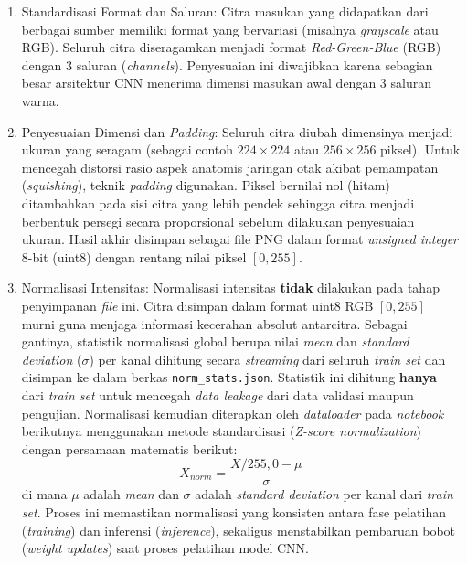 \begin{enumerate}
	\item Standardisasi Format dan Saluran:
	Citra masukan yang didapatkan dari berbagai sumber memiliki format yang bervariasi 
	(misalnya \textit{grayscale} atau RGB). Seluruh citra diseragamkan menjadi format 
	\textit{Red-Green-Blue} (RGB) dengan 3 saluran (\textit{channels}). Penyesuaian ini 
	diwajibkan karena sebagian besar arsitektur CNN menerima dimensi masukan awal dengan 
	3 saluran warna.
	
	\item Penyesuaian Dimensi dan \textit{Padding}:
	Seluruh citra diubah dimensinya menjadi ukuran yang seragam (sebagai contoh $224 \times 224$ 
	atau $256 \times 256$ piksel). Untuk mencegah distorsi rasio aspek anatomis jaringan otak 
	akibat pemampatan (\textit{squishing}), teknik \textit{padding} digunakan. Piksel bernilai 
	nol (hitam) ditambahkan pada sisi citra yang lebih pendek sehingga citra menjadi berbentuk 
	persegi secara proporsional sebelum dilakukan penyesuaian ukuran. Hasil akhir disimpan 
	sebagai file PNG dalam format \textit{unsigned integer} 8-bit (uint8) dengan rentang nilai 
	piksel $[0, 255]$.
	
	\item Normalisasi Intensitas:
	Normalisasi intensitas \textbf{tidak} dilakukan pada tahap penyimpanan \textit{file} 
	ini. Citra disimpan dalam format uint8 RGB $[0, 255]$ murni guna menjaga informasi 
	kecerahan absolut antarcitra. Sebagai gantinya, statistik normalisasi global berupa 
	nilai \textit{mean} dan \textit{standard deviation} ($\sigma$) per kanal dihitung 
	secara \textit{streaming} dari seluruh \textit{train set} dan disimpan ke dalam berkas 
	\texttt{norm\_stats.json}. Statistik ini dihitung \textbf{hanya} dari \textit{train set} 
	untuk mencegah \textit{data leakage} dari data validasi maupun pengujian. Normalisasi 
	kemudian diterapkan oleh \textit{dataloader} pada \textit{notebook} berikutnya 
	menggunakan metode standardisasi (\textit{Z-score normalization}) dengan persamaan 
	matematis berikut:
	\begin{equation}
		X_{norm} = \frac{X / 255{,}0 - \mu}{\sigma}
	\end{equation}
	di mana $\mu$ adalah \textit{mean} dan $\sigma$ adalah \textit{standard deviation} 
	per kanal dari \textit{train set}. Proses ini memastikan normalisasi yang konsisten 
	antara fase pelatihan (\textit{training}) dan inferensi (\textit{inference}), sekaligus 
	menstabilkan pembaruan bobot (\textit{weight updates}) saat proses pelatihan model CNN.
	

\end{enumerate}
